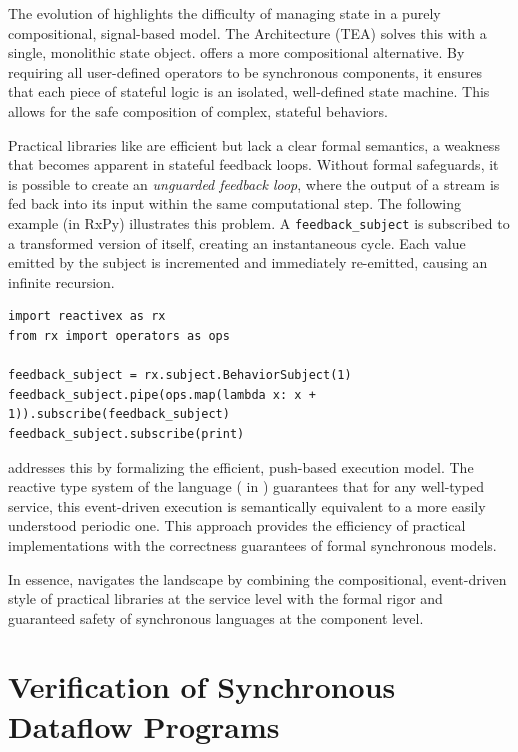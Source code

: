 The evolution of \Elm highlights the difficulty of managing state in a purely compositional,
signal-based model. The \Elm Architecture (TEA) solves this with a single, monolithic state
object. \GRust offers a more compositional alternative. By requiring all user-defined operators to
be synchronous \GRSync components, it ensures that each piece of stateful logic is an isolated,
well-defined state machine. This allows for the safe composition of complex, stateful behaviors.

Practical libraries like \ReactiveX are efficient but lack a clear formal semantics, a weakness that
becomes apparent in stateful feedback loops. Without formal safeguards, it is possible to create an
\emph{unguarded feedback loop}, where the output of a stream is fed back into its input within the
same computational step.
%
The following \ReactiveX example (in RxPy) illustrates this problem. A \texttt{feedback\_subject} is
subscribed to a transformed version of itself, creating an instantaneous cycle. Each value emitted
by the subject is incremented and immediately re-emitted, causing an infinite recursion.

\begin{lstlisting}[basicstyle=\ttfamily\footnotesize\color{BlackText}]
import reactivex as rx
from rx import operators as ops

feedback_subject = rx.subject.BehaviorSubject(1)
feedback_subject.pipe(ops.map(lambda x: x + 1)).subscribe(feedback_subject)
feedback_subject.subscribe(print)
\end{lstlisting}

\GRust addresses this by formalizing the efficient, push-based execution model. The reactive type
system of the language ( in
) guarantees that for any well-typed service, this event-driven execution is
semantically equivalent to a more easily understood periodic one. This approach provides the
efficiency of practical \frp implementations with the correctness guarantees of formal synchronous
models.

In essence, \GRust navigates the \frp landscape by combining the compositional, event-driven style
of practical libraries at the service level with the formal rigor and guaranteed safety of
synchronous languages at the component level.

\section{Verification of Synchronous Dataflow Programs}
\label{sec:sota:verification}

